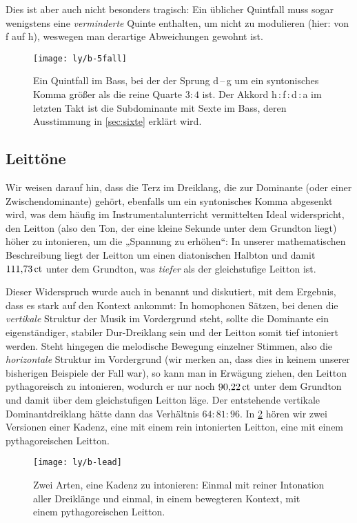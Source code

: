 Dies ist aber auch nicht besonders tragisch: Ein üblicher Quintfall muss sogar
wenigstens eine \emph{verminderte} Quinte enthalten, um nicht zu modulieren
(hier: von \naturalp f auf h), weswegen man derartige Abweichungen gewohnt ist.

\begin{figure}
  \centering
  \texttt{[image: ly/b-5fall]}
  \caption{Ein Quintfall im Bass, bei der der Sprung d\,–\,\naturalp g um ein
    syntonisches Komma größer als die reine Quarte $3:4$ ist.  Der Akkord
    h\,:\,\naturalp f\,:\,d\,:\,a im letzten Takt ist die Subdominante mit Sexte
    im Bass, deren Ausstimmung in \cref{sec:sixte} erklärt wird.}\label{fig:5fall}
\end{figure}

\subsection{Leittöne}
\label{sec:ln}

Wir weisen darauf hin, dass die Terz im Dreiklang, die zur Dominante (oder einer
Zwischendominante) gehört, ebenfalls um ein syntonisches Komma abgesenkt wird,
was dem häufig im Instrumentalunterricht vermittelten Ideal widerspricht, den
Leitton (also den Ton, der eine kleine Sekunde unter dem Grundton liegt) höher
zu intonieren, um die „Spannung zu erhöhen“: In unserer mathematischen
Beschreibung liegt der Leitton um einen diatonischen Halbton und damit
$111{,}73\,\text{ct}$ unter dem Grundton, was \emph{tiefer} als der gleichstufige
Leitton ist.

Dieser Widerspruch wurde auch in \cite[211]{viitasaari} benannt und
diskutiert, mit dem Ergebnis, dass es stark auf den Kontext ankommt: In
homophonen Sätzen, bei denen die \emph{vertikale} Struktur der Musik im
Vordergrund steht, sollte die Dominante ein eigenständiger, stabiler
Dur-Dreiklang sein und der Leitton somit tief intoniert werden. Steht hingegen
die melodische Bewegung einzelner Stimmen, also die \emph{horizontale} Struktur
im Vordergrund (wir merken an, dass dies in keinem unserer bisherigen Beispiele
der Fall war), so kann man in Erwägung ziehen, den Leitton pythagoreisch zu
intonieren, wodurch er nur noch $90{,}22\,\text{ct}$ unter dem Grundton und damit über
dem gleichstufigen Leitton läge. Der entstehende vertikale Dominantdreiklang
hätte dann das Verhältnis $64:81:96$. In \cref{fig:lead} hören wir zwei
Versionen einer Kadenz, eine mit einem rein intonierten Leitton, eine mit einem
pythagoreischen Leitton.

\begin{figure}
  \centering
  \texttt{[image: ly/b-lead]}
  \caption{Zwei Arten, eine Kadenz zu intonieren: Einmal mit reiner
    Intonation aller Dreiklänge und einmal, in einem bewegteren Kontext, mit
    einem pythagoreischen Leitton.}\label{fig:lead}
\end{figure}

